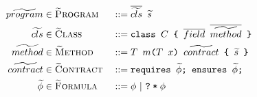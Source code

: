\begin{align*}
	\grad{program}  & \in \setGProgram  &  & ::= \ttt{$\overline{\grad{cls}}$~$\grad{s}$}                         \\
	\grad{cls}      & \in \setGClass    &  & ::= \class {$C$} {$\overline{field}$} {$\overline{\grad{method}}$}   \\
	\grad{method}   & \in \setGMethod   &  & ::= \method {$T$} {$m$} {$T$} {$x$} {$\grad{contract}$} {$\grad{s}$} \\
	\grad{contract} & \in \setGContract &  & ::= \contract{$\grad{\phi}$}{$\grad{\phi}$}                          \\
	\grad{\phi}     & \in \setGFormula  &  & ::= \phi ~|~ \withqm{\phi}
\end{align*}